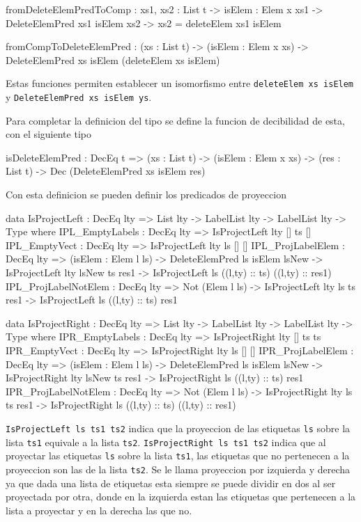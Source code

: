 \begin{code}
fromDeleteElemPredToComp : {xs1, xs2 : List t} -> 
  {isElem : Elem x xs1} -> DeleteElemPred xs1 isElem xs2 -> 
  xs2 = deleteElem xs1 isElem

fromCompToDeleteElemPred : (xs : List t) -> 
  (isElem : Elem x xs) -> 
  DeleteElemPred xs isElem (deleteElem xs isElem)
\end{code}

Estas funciones permiten establecer un isomorfismo entre \texttt{deleteElem xs isElem} y \texttt{DeleteElemPred xs isElem ys}.

Para completar la definicion del tipo se define la funcion de decibilidad de esta, con el siguiente tipo

\begin{code}
isDeleteElemPred : DecEq t => (xs : List t) -> 
  (isElem : Elem x xs) -> (res : List t) -> 
  Dec (DeleteElemPred xs isElem res)
\end{code}

Con esta definicion se pueden definir los predicados de proyeccion

\begin{code}
data IsProjectLeft : DecEq lty => List lty -> LabelList lty -> 
  LabelList lty -> Type where
  IPL_EmptyLabels : DecEq lty => IsProjectLeft {lty} [] ts []
  IPL_EmptyVect : DecEq lty => IsProjectLeft {lty} ls [] []
  IPL_ProjLabelElem : DecEq lty => (isElem : Elem l ls) -> 
    DeleteElemPred ls isElem lsNew ->
    IsProjectLeft {lty} lsNew ts res1 -> 
    IsProjectLeft ls ((l,ty) :: ts) ((l,ty) :: res1)      
  IPL_ProjLabelNotElem : DecEq lty => Not (Elem l ls) -> 
    IsProjectLeft {lty} ls ts res1 -> 
    IsProjectLeft ls ((l,ty) :: ts) res1

data IsProjectRight : DecEq lty => List lty -> LabelList lty -> 
  LabelList lty -> Type where
  IPR_EmptyLabels : DecEq lty => IsProjectRight {lty} [] ts ts
  IPR_EmptyVect : DecEq lty => IsProjectRight {lty} ls [] []
  IPR_ProjLabelElem : DecEq lty => (isElem : Elem l ls) -> 
    DeleteElemPred ls isElem lsNew ->
    IsProjectRight {lty} lsNew ts res1 -> 
    IsProjectRight ls ((l,ty) :: ts) res1      
  IPR_ProjLabelNotElem : DecEq lty => Not (Elem l ls) -> 
    IsProjectRight {lty} ls ts res1 -> 
    IsProjectRight ls ((l,ty) :: ts) ((l,ty) :: res1)
\end{code}

\texttt{IsProjectLeft ls ts1 ts2} indica que la proyeccion de las etiquetas \texttt{ls} sobre la lista \texttt{ts1} equivale a la lista \texttt{ts2}. \texttt{IsProjectRight ls ts1 ts2} indica que al proyectar las etiquetas \texttt{ls} sobre la lista \texttt{ts1}, las etiquetas que no pertenecen a la proyeccion son las de la lista \texttt{ts2}. Se le llama proyeccion por izquierda y derecha ya que dada una lista de etiquetas esta siempre se puede dividir en dos al ser proyectada por otra, donde en la izquierda estan las etiquetas que pertenecen a la lista a proyectar y en la derecha las que no.

